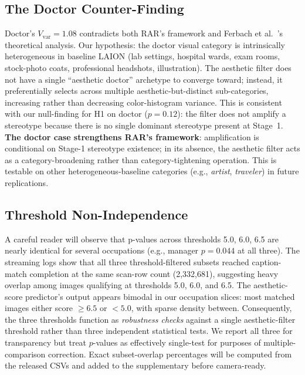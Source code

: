 \documentclass[manuscript, nonacm, screen, review]{acmart}
\begin{document}
\subsection{The Doctor Counter-Finding}
\label{sec:doctor}

Doctor's $V_{\text{var}}\!=\!1.08$ contradicts both RAR's framework and Ferbach et al.~\cite{ferbach2024selfconsuming}'s theoretical analysis. Our hypothesis: the doctor visual category is intrinsically heterogeneous in baseline LAION (lab settings, hospital wards, exam rooms, stock-photo coats, professional headshots, illustration). The aesthetic filter does not have a single ``aesthetic doctor'' archetype to converge toward; instead, it preferentially selects across multiple aesthetic-but-distinct sub-categories, increasing rather than decreasing color-histogram variance. This is consistent with our null-finding for H1 on doctor ($p\!=\!0.12$): the filter does not amplify a stereotype because there is no single dominant stereotype present at Stage~1. \textbf{The doctor case strengthens RAR's framework}: amplification is conditional on Stage-1 stereotype existence; in its absence, the aesthetic filter acts as a category-broadening rather than category-tightening operation. This is testable on other heterogeneous-baseline categories (e.g., \emph{artist}, \emph{traveler}) in future replications.

\subsection{Threshold Non-Independence}
\label{sec:threshold}

A careful reader will observe that p-values across thresholds 5.0, 6.0, 6.5 are nearly identical for several occupations (e.g., manager $p\!=\!0.044$ at all three). The streaming logs show that all three threshold-filtered subsets reached caption-match completion at the same scan-row count (2{,}332{,}681), suggesting heavy overlap among images qualifying at thresholds 5.0, 6.0, and 6.5. The aesthetic-score predictor's output appears bimodal in our occupation slices: most matched images either score $\geq 6.5$ or $<\!5.0$, with sparse density between. Consequently, the three thresholds function as \emph{robustness checks} against a single aesthetic-filter threshold rather than three independent statistical tests. We report all three for transparency but treat $p$-values as effectively single-test for purposes of multiple-comparison correction. Exact subset-overlap percentages will be computed from the released CSVs and added to the supplementary before camera-ready.
\end{document}
